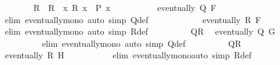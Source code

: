 \begin{isabellebody}
\ \ \ \ \ \ \isamarkupfalse%
\ R{\isacharprime}{\kern0pt}\ \ {\isachardoublequoteopen}R{\isacharprime}{\kern0pt}\ {\isacharequal}{\kern0pt}\ {\isacharparenleft}{\kern0pt}{\isasymlambda}x{\isachardot}{\kern0pt}\ R\ x\ {\isasymor}\ P\ x{\isacharparenright}{\kern0pt}{\isachardoublequoteclose}\isanewline
\ \ \ \ \ \ \isamarkupfalse%
\ {}\ \isamarkupfalse%
\ {\isachardoublequoteopen}eventually\ Q{\isacharprime}{\kern0pt}\ F{\isachardoublequoteclose}\ \isanewline
\ \ \ \ \ \ \ \ \isamarkupfalse%
\ {\isacharparenleft}{\kern0pt}elim\ eventually{\isacharunderscore}{\kern0pt}mono{\isacharparenright}{\kern0pt}\ {\isacharparenleft}{\kern0pt}auto\ simp{\isacharcolon}{\kern0pt}\ Q{\isacharprime}{\kern0pt}{\isacharunderscore}{\kern0pt}def{\isacharparenright}{\kern0pt}\isanewline
\ \ \ \ \ \ \isamarkupfalse%
\ \isamarkupfalse%
\ {}\ \isamarkupfalse%
\ {\isachardoublequoteopen}eventually\ R{\isacharprime}{\kern0pt}\ F{\isachardoublequoteclose}\ \isanewline
\ \ \ \ \ \ \ \ \isamarkupfalse%
\ {\isacharparenleft}{\kern0pt}elim\ eventually{\isacharunderscore}{\kern0pt}mono{\isacharparenright}{\kern0pt}\ {\isacharparenleft}{\kern0pt}auto\ simp{\isacharcolon}{\kern0pt}\ R{\isacharprime}{\kern0pt}{\isacharunderscore}{\kern0pt}def{\isacharparenright}{\kern0pt}\isanewline
\ \ \ \ \ \ \isamarkupfalse%
\ \isamarkupfalse%
\ QR{\isacharparenleft}{\kern0pt}{}{\isacharparenright}{\kern0pt}\ \isamarkupfalse%
\ {\isachardoublequoteopen}eventually\ Q{\isacharprime}{\kern0pt}\ G{\isachardoublequoteclose}\ \isanewline
\ \ \ \ \ \ \ \ \isamarkupfalse%
\ {\isacharparenleft}{\kern0pt}elim\ eventually{\isacharunderscore}{\kern0pt}mono{\isacharparenright}{\kern0pt}\ {\isacharparenleft}{\kern0pt}auto\ simp{\isacharcolon}{\kern0pt}\ Q{\isacharprime}{\kern0pt}{\isacharunderscore}{\kern0pt}def{\isacharparenright}{\kern0pt}\isanewline
\ \ \ \ \ \ \isamarkupfalse%
\ \isamarkupfalse%
\ QR{\isacharparenleft}{\kern0pt}{}{\isacharparenright}{\kern0pt}\ \isamarkupfalse%
\ {\isachardoublequoteopen}eventually\ R{\isacharprime}{\kern0pt}\ H{\isachardoublequoteclose}\ \isanewline
\ \ \ \ \ \ \ \ \isamarkupfalse%
\ {\isacharparenleft}{\kern0pt}elim\ eventually{\isacharunderscore}{\kern0pt}mono{\isacharparenright}{\kern0pt}{\isacharparenleft}{\kern0pt}auto\ simp{\isacharcolon}{\kern0pt}\ R{\isacharprime}{\kern0pt}{\isacharunderscore}{\kern0pt}def{\isacharparenright}{\kern0pt}\isanewline

\end{isabellebody}
